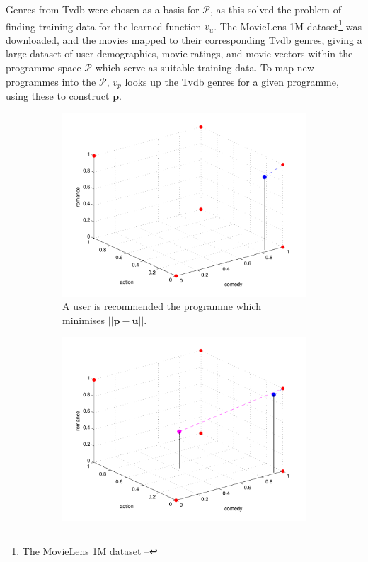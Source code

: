		Genres from Tvdb were chosen as a basis for $\mathcal{P}$, as this solved the problem of finding training data for the learned function $v_u$. The MovieLens 1M dataset\footnote{The MovieLens 1M dataset -- } was downloaded, and the movies mapped to their corresponding Tvdb genres, giving a large dataset of user demographics, movie ratings, and movie vectors within the programme space $\mathcal{P}$ which serve as suitable training data. To map new programmes into the $\mathcal{P}$, $v_p$ looks up the Tvdb genres for a given programme, using these to construct $\mathbf{p}$.

			\begin{figure}[h!]
				\begin{center}
				\begin{subfigure}[t]{0.32\textwidth}
					\includegraphics[width=\textwidth]{images/recommender_1.pdf}
					\caption{A user is recommended the programme which minimises $||\mathbf{p} - \mathbf{u}||$.}
				\end{subfigure}
				\begin{subfigure}[t]{0.32\textwidth}
					\includegraphics[width=\textwidth]{images/recommender_2.pdf}

\end{subfigure}
\end{center}
\end{figure}
